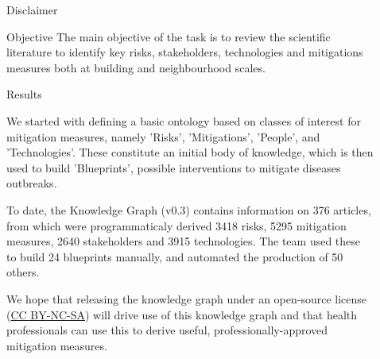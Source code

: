 \documentclass[final]{beamer}
\newlength{\sepwid}
\newlength{\onecolwid}
\begin{document}
\begin{columns}[t]
\begin{column}{\onecolwid}
\begin{block}{Disclaimer}
          \end{block}
          
          \begin{block}{Objective}
The main objective of the task is to review the scientific literature to identify key risks, stakeholders, technologies and mitigations measures both at building and neighbourhood scales.

          \end{block}
          
          
          \begin{block}{Results}

We started with defining a basic ontology based on classes of interest for mitigation measures, namely 'Risks', 'Mitigations', 'People', and 'Technologies'. These constitute an initial body of knowledge, which is then used to build 'Blueprints', possible interventions to mitigate diseases outbreaks. 

To date, the Knowledge Graph (v0.3) contains information on 376 articles, from which were programmaticaly derived 3418 risks, 5295 mitigation measures, 2640 stakeholders and 3915 technologies. The team used these to build 24 blueprints manually, and automated the production of 50 others.

We hope that releasing the knowledge graph under an open-source license  (\href{https://creativecommons.org/licenses/by-nc-sa/4.0/deed.en}{CC BY-NC-SA}) will drive use of this knowledge graph and that health professionals can use this to derive useful, professionally-approved mitigation measures.

          \end{block}
         
         \end{column}
                  
                  
         \begin{column}{\sepwid}  \end{column}
         
         
         
         
         \begin{column}{\onecolwid} %
         

\end{column}
\end{columns}
\end{document}
